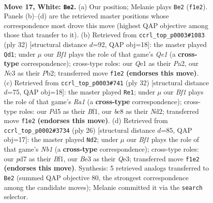\documentclass[11pt]{article}
\begin{document}
\clearpage

\begin{figure}[p]\centering
\begin{subfigure}{0.46\textwidth}\centering
\resizebox{\linewidth}{!}{%
\newchessgame
\chessboard[
  setfen={r1bq2k1/pppp1ppp/1b1n4/3P4/8/2N1B2P/PPP2PP1/R3QBK1 w - - 5 17},
  showmover=false,
  pgfstyle=straightmove, color=movearrow, markmove={f1-e2}
]}
\caption{}
\end{subfigure}\hfill
\begin{subfigure}{0.46\textwidth}\centering
\resizebox{\linewidth}{!}{%
\newchessgame
\chessboard[
  setfen={1r4k1/ppq2ppp/3b1n2/2p2b2/3p1N2/3P2PP/PPPB1PB1/R3Q1K1 w - - 1 17},
  showmover=false,
  pgfstyle=straightmove, color=movearrow, markmove={e1-d1}
]}
\caption{}
\end{subfigure}
\\[4pt]
\begin{subfigure}{0.46\textwidth}\centering
\resizebox{\linewidth}{!}{%
\newchessgame
\chessboard[
  setfen={r2qn1k1/1p3ppp/2p2b2/p2p1b2/3P1B2/2P1Q2P/PP1N1PP1/R4BK1 w - - 0 17},
  showmover=false,
  pgfstyle=straightmove, color=movearrow, markmove={a1-e1}
]}
\caption{}
\end{subfigure}\hfill
\begin{subfigure}{0.46\textwidth}\centering
\resizebox{\linewidth}{!}{%
\newchessgame
\chessboard[
  setfen={r1bqn1k1/ppp2ppp/5b2/3p4/3P1B2/4Q3/PPP2PPP/RN3BK1 w - - 0 14},
  showmover=false,
  pgfstyle=straightmove, color=movearrow, markmove={b1-d2}
]}
\caption{}
\end{subfigure}
\caption{\textbf{Move 17, White: \texttt{Be2}.} (a) Our position; Melanie plays \texttt{Be2} (\texttt{f1e2}). Panels (b)--(d) are the retrieved master positions whose correspondence most drove this move (highest QAP objective among those that transfer to it). (b) Retrieved from \texttt{ccrl\_top\_p0003\#1083} (ply 32) [structural distance $d$=92, QAP obj=18]: the master played \texttt{Qd1}; under $\mu$ our \emph{Bf1} plays the role of that game's \emph{Qe1} (a \textbf{cross-type} correspondence); cross-type roles: our \emph{Q}e1 as their \emph{P}a2, our \emph{N}c3 as their \emph{P}b2; transferred move \texttt{f1e2} \textbf{(endorses this move)}. (c) Retrieved from \texttt{ccrl\_top\_p0003\#741} (ply 32) [structural distance $d$=75, QAP obj=18]: the master played \texttt{Re1}; under $\mu$ our \emph{Bf1} plays the role of that game's \emph{Ra1} (a \textbf{cross-type} correspondence); cross-type roles: our \emph{P}d5 as their \emph{B}f1, our \emph{b}c8 as their \emph{N}d2; transferred move \texttt{f1e2} \textbf{(endorses this move)}. (d) Retrieved from \texttt{ccrl\_top\_p0002\#3734} (ply 26) [structural distance $d$=85, QAP obj=17]: the master played \texttt{Nd2}; under $\mu$ our \emph{Bf1} plays the role of that game's \emph{Nb1} (a \textbf{cross-type} correspondence); cross-type roles: our \emph{p}d7 as their \emph{B}f1, our \emph{B}e3 as their \emph{Q}e3; transferred move \texttt{f1e2} \textbf{(endorses this move)}. Synthesis: 5 retrieved analogs transferred to \texttt{Be2} (summed QAP objective 80, the strongest correspondence among the candidate moves); Melanie committed it via the \texttt{search} selector.}
\label{fig:thought-m32}
\end{figure}
\end{document}
